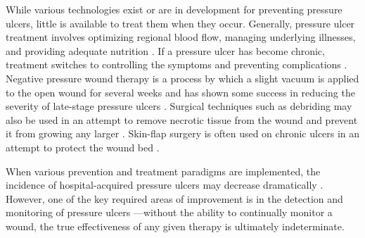 			While various technologies exist or are in development for preventing pressure ulcers, little is available to treat them when they occur. Generally, pressure ulcer treatment involves optimizing regional blood flow, managing underlying illnesses, and providing adequate nutrition \cite{jaul10}. If a pressure ulcer has become chronic, treatment switches to controlling the symptoms and preventing complications \cite{jaul10}. Negative pressure wound therapy is a process by which a slight vacuum is applied to the open wound for several weeks and has shown some success in reducing the severity of late-stage pressure ulcers \cite{greer13}. Surgical techniques such as debriding may also be used in an attempt to remove necrotic tissue from the wound and prevent it from growing any larger \cite{longe86,brem02}. Skin-flap surgery is often used on chronic ulcers in an attempt to protect the wound bed \cite{biglari14}.

			When various prevention and treatment paradigms are implemented, the incidence of hospital-acquired pressure ulcers may decrease dramatically \cite{bales11,thompson11,carson11}. However, one of the key required areas of improvement is in the detection and monitoring of pressure ulcers \cite{milne09}---without the ability to continually monitor a wound, the true effectiveness of any given therapy is ultimately indeterminate.

